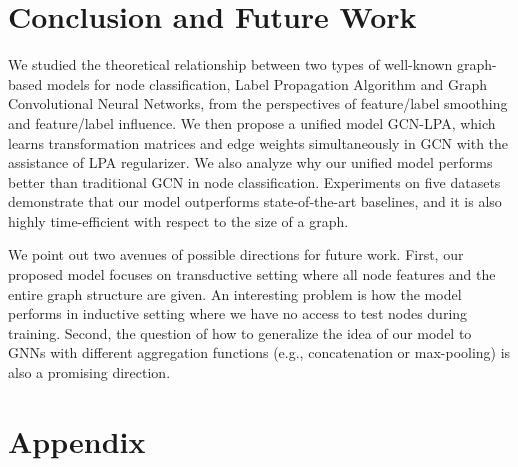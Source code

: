 \documentclass{article}
\begin{document}
\section{Conclusion and Future Work}
	We studied the theoretical relationship between two types of well-known graph-based models for node classification, Label Propagation Algorithm and Graph Convolutional Neural Networks, from the perspectives of feature/label smoothing and feature/label influence.
	We then propose a unified model GCN-LPA, which learns transformation matrices and edge weights simultaneously in GCN with the assistance of LPA regularizer.
	We also analyze why our unified model performs better than traditional GCN in node classification.
	Experiments on five datasets demonstrate that our model outperforms state-of-the-art baselines, and it is also highly time-efficient with respect to the size of a graph.
	
	We point out two avenues of possible directions for future work.
	First, our proposed model focuses on transductive setting where all node features and the entire graph structure are given.
	An interesting problem is how the model performs in inductive setting where we have no access to test nodes during training.
Second, the question of how to generalize the idea of our model to GNNs with different aggregation functions (e.g., concatenation or max-pooling) is also a promising direction.






\clearpage
\renewcommand\thesubsection{\Alph{subsection}}
\onecolumn

\section*{Appendix}
\end{document}
